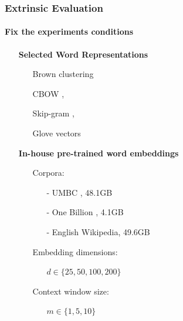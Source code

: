 \documentclass{beamer}
\begin{document}
\begin{frame}
\frametitle{\textbf{Extrinsic Evaluation}}
\framesubtitle{Fix the experiments conditions}
  
\begin{itemize}
\item[\ding{224}] \textbf{Selected Word Representations} 
	\begin{itemize}
		\item[\ding{76}] Brown clustering \cite{Brown92class-basedn-gram}
		\item[\ding{76}] CBOW \cite{Mikolov13},
		\item[\ding{76}]	 Skip-gram \cite{Mikolov13NIPS},
		\item[\ding{76}]	 Glove vectors \cite{pennington2014glove} 
	\end{itemize} 
\item[]
\item[\ding{224}] \textbf{In-house pre-trained word embeddings}
	\begin{itemize}			
		\item[\ding{111}] Corpora:
			\begin{itemize}			
				\item[-] UMBC \cite{UMBC:2013}, 48.1GB 
				\item[-] One Billion \cite{OneBillion:2013}, 4.1GB 
				\item[-] English Wikipedia, 49.6GB 		
			\end{itemize}
		\item[\ding{111}] Embedding dimensions:
			\begin{itemize}
				 \item[] $d \in \{25, 50, 100, 200\}$
			\end{itemize}
		\item[\ding{111}] Context window size:
			\begin{itemize}
				 \item[] $m \in \{1, 5, 10\}$	
			\end{itemize}
	\end{itemize} 					
\end{itemize}      
\end{frame}
\end{document}
